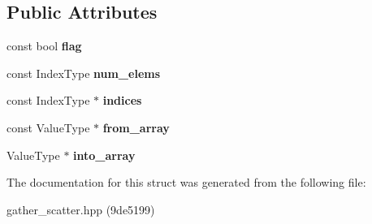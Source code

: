 \subsection*{Public Attributes}
\begin{DoxyCompactItemize}
\item 
\mbox{\label{structGatherScatter_ae0a023c43a44d3398c337759f73c450a}} 
const bool {\bfseries flag}
\item 
\mbox{\label{structGatherScatter_a7a77a08c144b7640c2e595ffcb95e9f6}} 
const Index\+Type {\bfseries num\+\_\+elems}
\item 
\mbox{\label{structGatherScatter_acfd3e8f7792e7e8d84558210c80feb8d}} 
const Index\+Type $\ast$ {\bfseries indices}
\item 
\mbox{\label{structGatherScatter_adbdf8c559625f452f62843c36a629993}} 
const Value\+Type $\ast$ {\bfseries from\+\_\+array}
\item 
\mbox{\label{structGatherScatter_a389b25cdf1bee5084d19f6df1ea53937}} 
Value\+Type $\ast$ {\bfseries into\+\_\+array}
\end{DoxyCompactItemize}


The documentation for this struct was generated from the following file\+:\begin{DoxyCompactItemize}
\item 
gather\+\_\+scatter.\+hpp (9de5199)\end{DoxyCompactItemize}
